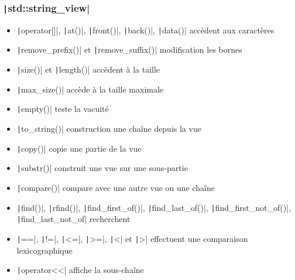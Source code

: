 \documentclass[C++.tex]{subfiles}
\begin{document}
\begin{frame}[fragile]
	\frametitle{\texttt|std::string_view|}
	\begin{itemize}
		\item \texttt|operator[]|, \texttt|at()|, \texttt|front()|, \texttt|back()|, \texttt|data()| accèdent aux caractères
		\item \texttt|remove_prefix()| et \texttt|remove_suffix()| modification les bornes
		\item \texttt|size()| et \texttt|length()| accèdent à la taille
		\item \texttt|max_size()| accède à la taille maximale
		\item \texttt|empty()| teste la vacuité
		\item \texttt|to_string()| construction une chaîne depuis la vue
		\item \texttt|copy()| copie une partie de la vue
		\item \texttt|substr()| construit une vue sur une sous-partie
		\item \texttt|compare()| compare avec une autre vue ou une chaîne
		\item \texttt|find()|, \texttt|rfind()|, \texttt|find_first_of()|, \texttt|find_last_of()|, \texttt|find_first_not_of()|, \texttt|find_last_not_of| recherchent
		\item \texttt|==|, \texttt|!=|, \texttt|<=|, \texttt|>=|, \texttt|<| et \texttt|>| effectuent une comparaison lexicographique
		\item \texttt|operator<<| affiche la sous-chaîne
	\end{itemize}
\end{frame}
\end{document}
